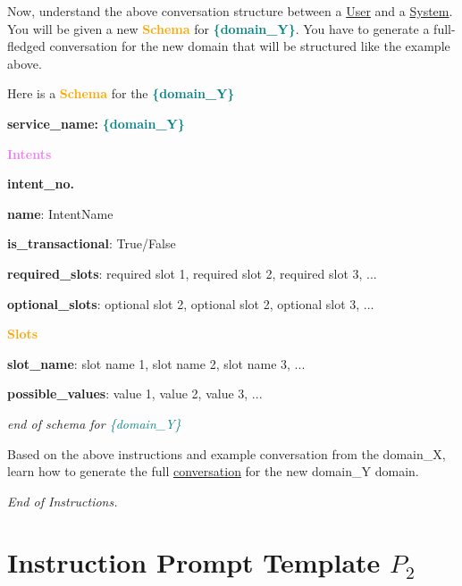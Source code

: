\begin{tcolorbox}[colframe=black, colback=white, boxrule=1pt]
Now, understand the above conversation structure between a \underline{User} and a \underline{System}. You will be given a new \textbf{{\textcolor{orange}{Schema}}} for \textbf{\textcolor{teal}{\{domain\_Y\}}}. You have to generate a full-fledged conversation for the new domain that will be structured like the example above. 
\end{tcolorbox}

\begin{tcolorbox}[colframe=black, colback=white, boxrule=1pt]

Here is a \textbf{{\textcolor{orange}{Schema}}} for the \textbf{\textcolor{teal}{\{domain\_Y\}}}

\textbf{service\_name:} \textbf{\textcolor{teal}{\{domain\_Y\}}}

\textbf{\textcolor{violet}{Intents}}

\quad \textbf{{intent\_no.}} 

\quad \textbf{name}: IntentName

\quad \textbf{is\_transactional}: True/False

\quad \textbf{\textcolor{blue!70}{required\_slots}}: required slot 1, required slot 2, required slot 3, ...

\quad \textbf{\textcolor{blue!70}{optional\_slots}}: optional slot 2, optional slot 2, optional slot 3, ...

\textbf{\textcolor{orange}{Slots}}

\quad \quad \textbf{slot\_name}: slot name 1, slot name 2, slot name 3, ...

\quad \quad \textbf{possible\_values}: value 1, value 2, value 3, ...

\textit{end of schema for \textcolor{teal}{\{domain\_Y\}}}

\end{tcolorbox}

\begin{tcolorbox}[colframe=black, colback=white, boxrule=1pt]
Based on the above instructions and example conversation from the {domain\_X}, learn how to generate the full \underline{conversation} for the new {domain\_Y} domain.

\textit{End of Instructions.}
\end{tcolorbox}


\section*{Instruction Prompt Template \(P_2\)} \label{sec:prompt2}

